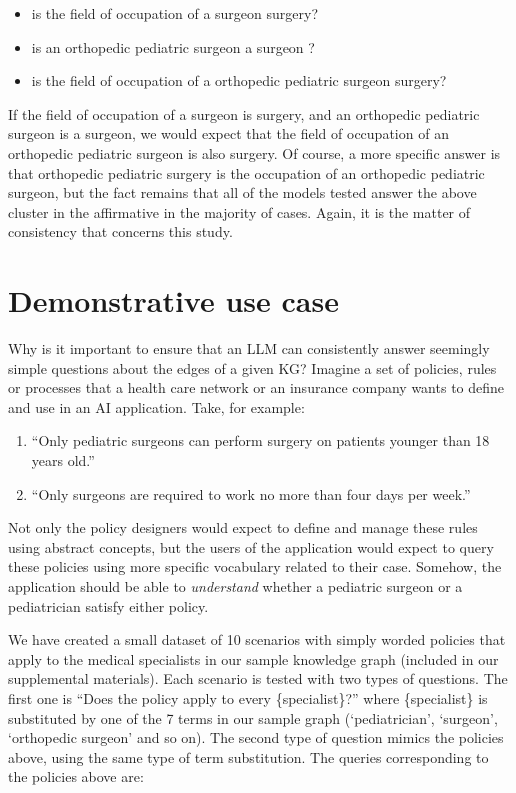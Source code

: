 \documentclass{article} %
\begin{document}
\begin{itemize}
\item is the field of occupation of a surgeon surgery?
\item is an orthopedic pediatric surgeon a surgeon ?
\item is the field of occupation of a orthopedic pediatric surgeon surgery?
\end{itemize}

If the field of occupation of a surgeon is surgery, and an orthopedic pediatric surgeon is a surgeon, we would expect that the field of occupation of an orthopedic pediatric surgeon is also surgery. Of course, a more specific answer is that orthopedic pediatric surgery is the occupation of an orthopedic pediatric surgeon, but the fact remains that all of the models tested answer the above cluster in the affirmative in the majority of cases. Again, it is the matter of consistency that concerns this study. 

\section{Demonstrative use case}
\label{sec:use_case}

Why is it important to ensure that an LLM can consistently answer seemingly simple questions about the edges of a given KG? Imagine a set of policies, rules or processes that a health care network or an insurance company wants to define and use in an AI application. Take, for example:
\begin{enumerate}
    \item ``Only pediatric surgeons can perform surgery on patients younger than 18 years old.''
    \item ``Only surgeons are required to work no more than four days per week.''
\end{enumerate}

Not only the policy designers would expect to define and manage these rules using abstract concepts, but the users of the application would expect to query these policies using more specific vocabulary related to their case. Somehow, the application should be able to \textit{understand} whether a pediatric surgeon or a pediatrician satisfy either policy.   

We have created a small dataset of 10 scenarios with simply worded policies that apply to the medical specialists in our sample knowledge graph (included in our supplemental materials). Each scenario is tested with two types of questions. The first one is ``Does the policy apply to every \{specialist\}?'' where \{specialist\} is substituted by one of the 7 terms in our sample graph (`pediatrician', `surgeon', `orthopedic surgeon' and so on). The second type of question mimics the policies above, using the same type of term substitution. The queries corresponding to the policies above are:  
\end{document}
